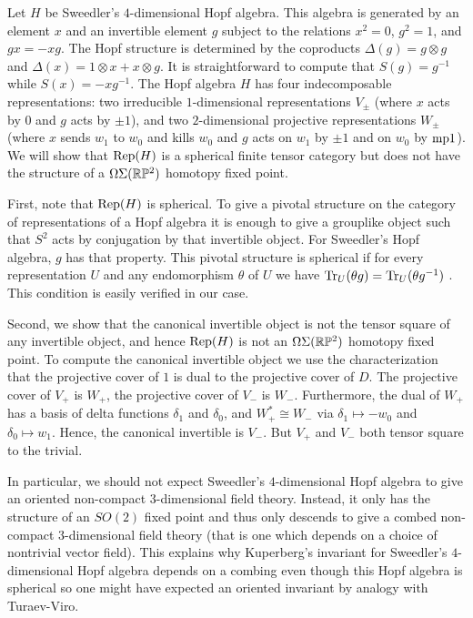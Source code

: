 \documentclass{amsart}
\begin{document}
\begin{example}
Let $H$ be Sweedler's $4$-dimensional Hopf algebra.  This algebra is generated by an element $x$ and an invertible element $g$ subject to the relations $x^2 = 0$, $g^2 = 1$, and $gx = -xg$.  The Hopf structure is determined by the coproducts $\Delta(g) = g \otimes g$ and $\Delta(x) = 1 \otimes x + x \otimes g$.  It is straightforward to compute that $S(g) = g^{-1}$ while $S(x) = - x g^{-1}$.  The Hopf algebra $H$ has four indecomposable representations: two irreducible $1$-dimensional representations $V_{\pm}$ (where $x$ acts by $0$ and $g$ acts by $\pm 1$), and two $2$-dimensional projective representations $W_\pm$ (where $x$ sends $w_1$ to $w_0$ and kills $w_0$ and $g$ acts on $w_1$ by $\pm 1$ and on $w_0$ by $\minusplus 1$). We will show that $\mathrm{Rep}(H)$ is a spherical finite tensor category but does not have the structure of a $\Omega \Sigma (\mathbb R \mathbb P^2)$ homotopy fixed point.

First, note that $\mathrm{Rep}(H)$ is spherical.  To give a pivotal structure on the category of representations of a Hopf algebra it is enough to give a grouplike object such that $S^2$ acts by conjugation by that invertible object.  For Sweedler's Hopf algebra, $g$ has that property.  This pivotal structure is spherical if for every representation $U$ and any endomorphism $\theta$ of $U$ we have $\mathrm{Tr}_U(\theta g) = \mathrm{Tr}_U(\theta g^{-1})$ \cite{???}.  This condition is easily verified in our case.

Second, we show that the canonical invertible object is not the tensor square of any invertible object, and hence $\mathrm{Rep}(H)$ is not an $\Omega \Sigma (\mathbb R \mathbb P^2)$ homotopy fixed point.  To compute the canonical invertible object we use the characterization that the projective cover of $1$ is dual to the projective cover of $D$.  The projective cover of $V_+$ is $W_+$, the projective cover of $V_-$ is $W_-$.  Furthermore, the dual of $W_+$ has a basis of delta functions $\delta_1$ and $\delta_0$, and $W_+^* \cong W_-$ via $\delta_1 \mapsto -w_0$ and $\delta_0 \mapsto w_1$.  Hence, the canonical invertible is $V_-$.  But $V_+$ and $V_-$ both tensor square to the trivial.
\end{example}

\begin{remark}
In particular, we should not expect Sweedler's $4$-dimensional Hopf algebra to give an oriented non-compact $3$-dimensional field theory.  Instead, it only has the structure of an $SO(2)$ fixed point and thus only descends to give a combed non-compact $3$-dimensional field theory (that is one which depends on a choice of nontrivial vector field).  This explains why Kuperberg's invariant for Sweedler's $4$-dimensional Hopf algebra \cite{???}depends on a combing even though this Hopf algebra is spherical so one might have expected an oriented invariant by analogy with Turaev-Viro.
\end{remark}
\end{document}
